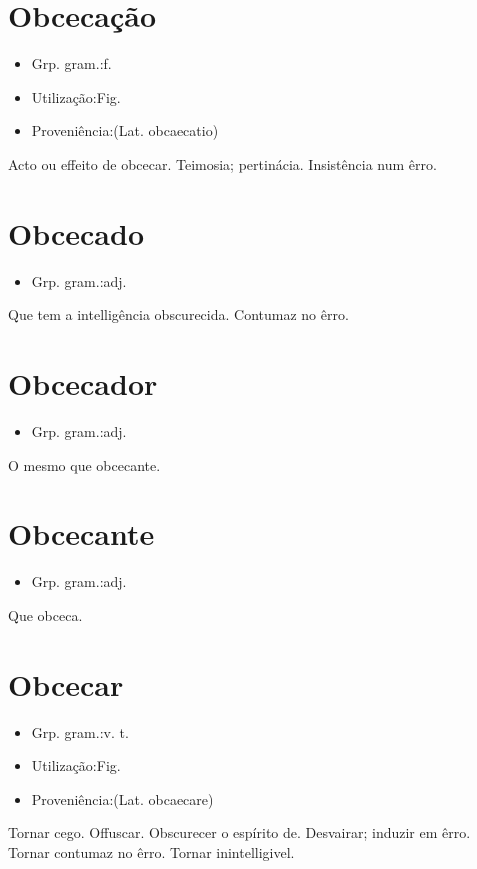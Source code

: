 \section{Obcecação}
\begin{itemize}
\item {Grp. gram.:f.}
\end{itemize}
\begin{itemize}
\item {Utilização:Fig.}
\end{itemize}
\begin{itemize}
\item {Proveniência:(Lat. \textunderscore obcaecatio\textunderscore )}
\end{itemize}
Acto ou effeito de obcecar.
Teimosia; pertinácia.
Insistência num êrro.
\section{Obcecado}
\begin{itemize}
\item {Grp. gram.:adj.}
\end{itemize}
Que tem a intelligência obscurecida.
Contumaz no êrro.
\section{Obcecador}
\begin{itemize}
\item {Grp. gram.:adj.}
\end{itemize}
O mesmo que \textunderscore obcecante\textunderscore .
\section{Obcecante}
\begin{itemize}
\item {Grp. gram.:adj.}
\end{itemize}
Que obceca.
\section{Obcecar}
\begin{itemize}
\item {Grp. gram.:v. t.}
\end{itemize}
\begin{itemize}
\item {Utilização:Fig.}
\end{itemize}
\begin{itemize}
\item {Proveniência:(Lat. \textunderscore obcaecare\textunderscore )}
\end{itemize}
Tornar cego.
Offuscar.
Obscurecer o espírito de.
Desvairar; induzir em êrro.
Tornar contumaz no êrro.
Tornar inintelligivel.
